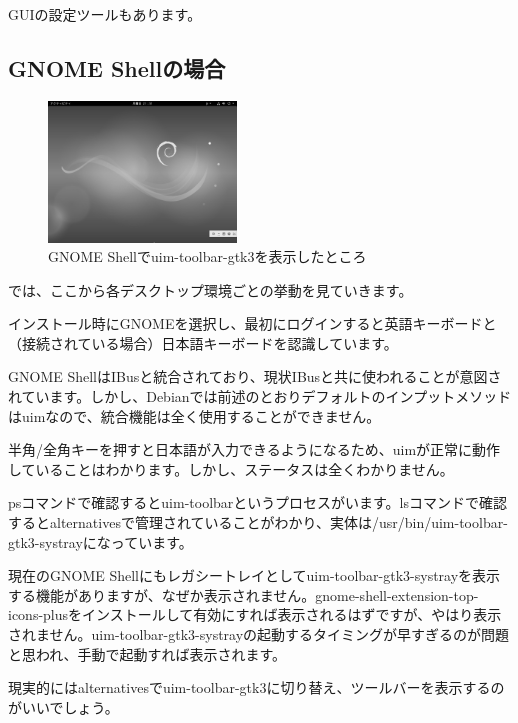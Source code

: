 \documentclass[mingoth,a4paper]{jsarticle}
\begin{document}
GUIの設定ツールもあります。

\subsection{GNOME Shellの場合}
\begin{figure}
    \begin{center}
        \includegraphics[width=5cm]{image201708/gnome-uim-toolbar-gtk3_gray.png}
        \caption{GNOME Shellでuim-toolbar-gtk3を表示したところ}
    \end{center}
\end{figure}
では、ここから各デスクトップ環境ごとの挙動を見ていきます。

インストール時にGNOMEを選択し、最初にログインすると英語キーボードと（接続されている場合）日本語キーボードを認識しています。

GNOME ShellはIBusと統合されており、現状IBusと共に使われることが意図されています。しかし、Debianでは前述のとおりデフォルトのインプットメソッドはuimなので、統合機能は全く使用することができません。

半角/全角キーを押すと日本語が入力できるようになるため、uimが正常に動作していることはわかります。しかし、ステータスは全くわかりません。

psコマンドで確認するとuim-toolbarというプロセスがいます。lsコマンドで確認するとalternativesで管理されていることがわかり、実体は/usr/bin/uim-toolbar-gtk3-systrayになっています。

現在のGNOME Shellにもレガシートレイとしてuim-toolbar-gtk3-systrayを表示する機能がありますが、なぜか表示されません。gnome-shell-extension-top-icons-plusをインストールして有効にすれば表示されるはずですが、やはり表示されません。uim-toolbar-gtk3-systrayの起動するタイミングが早すぎるのが問題と思われ、手動で起動すれば表示されます。

現実的にはalternativesでuim-toolbar-gtk3に切り替え、ツールバーを表示するのがいいでしょう。
\end{document}
